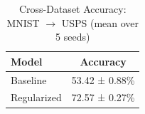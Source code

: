 
\begin{table}[h]
\centering
\caption{Cross-Dataset Accuracy: MNIST $\rightarrow$ USPS (mean over 5 seeds)}
\label{tab:extension_cross_dataset_usps}
\begin{tabular}{lc}
\toprule
\textbf{Model} & \textbf{Accuracy} \\
\midrule
Baseline & 53.42 ± 0.88\% \\
Regularized & 72.57 ± 0.27\% \\
\bottomrule
\end{tabular}
\end{table}
